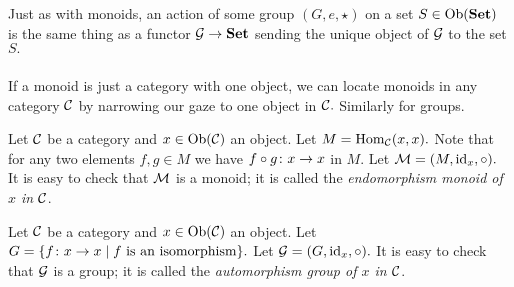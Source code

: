 \documentclass[../main/CT4S-EN-RU]{subfiles}
\begin{document}
\begin{theoremRUS}\label{thm:grp to cat}
\end{theoremRUS}

\begin{blockENG}
Just as with monoids, an action of some group $(G,e,\star)$ on a set $S\in\operatorname{Ob}({\mathbf{Set}})$ is the same thing as a functor $\mathcal{G}\rightarrow{\mathbf{Set}}$ sending the unique object of $\mathcal{G}$ to the set $S.$ 
\end{blockENG}

\begin{blockRUS}
\end{blockRUS}


\subsubsection{}

\begin{blockENG}
If a monoid is just a category with one object, we can locate monoids in any category $\mathcal{C}$ by narrowing our gaze to one object in $\mathcal{C}.$ Similarly for groups.
\end{blockENG}

\begin{blockRUS}
\end{blockRUS}

\begin{exampleENG}
Let $\mathcal{C}$ be a category and $x\in\operatorname{Ob}(\mathcal{C})$ an object. Let $M=\operatorname{Hom}_\mathcal{C}(x,x).$ Note that for any two elements $f,g\in M$ we have $f\circ g\colon x\rightarrow x$ in $M.$ Let $\mathcal{M}=(M,\operatorname{id}_x,\circ).$ It is easy to check that $\mathcal{M}$ is a monoid; it is called the {\em endomorphism monoid of $x$ in $\mathcal{C}$}.
\end{exampleENG}

\begin{exampleRUS}
\end{exampleRUS}

\begin{exampleENG}
Let $\mathcal{C}$ be a category and $x\in\operatorname{Ob}(\mathcal{C})$ an object. Let $G=\{f\colon x\rightarrow x{\;|\;}f\textnormal{ is an isomorphism}\}.$ Let $\mathcal{G}=(G,\operatorname{id}_x,\circ).$ It is easy to check that $\mathcal{G}$ is a group; it is called the {\em automorphism group of $x$ in $\mathcal{C}$}.
\end{exampleENG}
\end{document}
